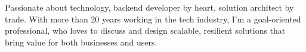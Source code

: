 

\begin{cvparagraph}
Passionate about technology, backend developer by heart, solution architect by trade. With more than 20 years working in the tech industry, I'm a goal-oriented professional, who loves to discuss and design scalable, resilient solutions that bring value for both businesses and users.
\end{cvparagraph}
